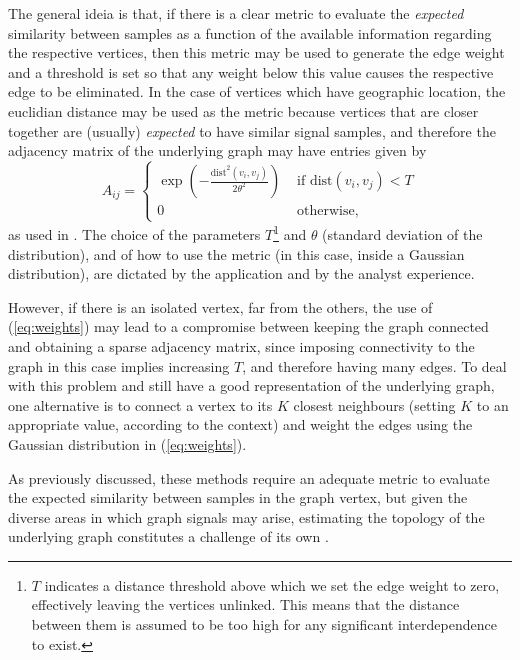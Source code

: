 The general ideia is that, if there is a clear metric to evaluate the \emph{expected} similarity between samples as a function of the available information regarding the respective vertices, then this metric may be used to generate the edge weight and a threshold is set so that any weight below this value causes the respective edge to be eliminated. In the case of vertices which have geographic location, the euclidian distance may be used as the metric because vertices that are closer together are (usually) \emph{expected} to have similar signal samples, and therefore the adjacency matrix of the underlying graph may have entries given by
\begin{equation}
\label{eq:weights}
A_{ij} =
\begin{cases}
\displaystyle
\exp \left(- \frac{\text{dist}^2(v_i, v_j)}{2 \theta^2}\right)& \text{ if } \text{dist}(v_i, v_j) < T \\ 
0 & \text{ otherwise},
\end{cases}
\end{equation}
as used in \cite{shuman2013emerging}. The choice of the parameters $ T $\footnote{$ T $ indicates a distance threshold above which we set the edge weight to zero, effectively leaving the vertices unlinked. This means that the distance between them is assumed to be too high for any significant interdependence to exist.} and $ \theta $ (standard deviation of the distribution), and of how to use the metric (in this case, inside a Gaussian distribution), are dictated by the application and by the analyst experience. 

However, if there is an isolated vertex, far from the others, the use of (\ref{eq:weights}) may lead to a compromise between keeping the graph connected and obtaining a sparse adjacency matrix, since imposing connectivity to the graph in this case implies increasing $ T $, and therefore having many edges. To deal with this problem and still have a good representation of the underlying graph, one alternative is to connect a vertex to its $ K $ closest neighbours (setting $ K $ to an appropriate value, according to the context) and weight the edges using the Gaussian distribution in (\ref{eq:weights}).

As previously discussed, these methods require an adequate metric to evaluate the expected similarity between samples in the graph vertex, but given the diverse areas in which graph signals may arise, estimating the topology of the  underlying graph constitutes a challenge of its own \cite{mei2016signal,Sardellitti2016}.

